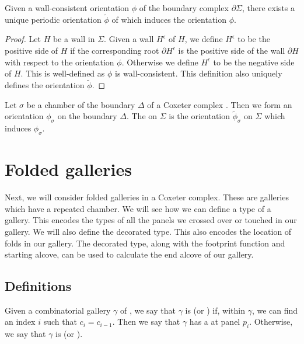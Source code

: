 \documentclass[11pt]{article}
\begin{document}
\begin{lemma}
    Given a wall-consistent orientation $\phi$ of the boundary complex $\partial\Sigma$, there exists a unique periodic orientation $\tilde{\phi}$ of \sg which induces the orientation $\phi$. 
\end{lemma}

\begin{proof}
    Let $H$ be a wall in $\Sigma$. Given a wall $H^\epsilon$ of $H$, we define $H^\epsilon$ to be the positive side of $H$ if the corresponding root $\partial H^\epsilon$ is the positive side of the wall $\partial H$ with respect to the orientation $\phi$. Otherwise we define $H^\epsilon$ to be the negative side of $H$. This is well-defined as $\phi$ is wall-consistent. This definition also uniquely defines the orientation $\tilde{\phi}$. 
\end{proof}

\begin{definition}
    Let $\sigma$ be a chamber of the boundary $\Delta$ of a Coxeter complex \sg. Then we form an orientation $\phi_{\sigma}$ on the boundary $\Delta$. The  on $\Sigma$ is the orientation $\tilde{\phi}_\sigma$ on $\Sigma$ which induces $\phi_{\sigma}$. 
\end{definition}


\section{Folded galleries}\label{7}

Next, we will consider folded galleries in a Coxeter complex. These are galleries which have a repeated chamber. We will see how we can define a type of a gallery. This encodes the types of all the panels we crossed over or touched in our gallery. We will also define the decorated type. This also encodes the location of folds in our gallery. The decorated type, along with the footprint function and starting alcove, can be used to calculate the end alcove of our gallery. 

\subsection{Definitions}


\begin{definition}
    Given a combinatorial gallery $\gamma$ of \sg, we say that $\gamma$ is  (or ) if, within $\gamma$, we can find an index $i$ such that $c_i=c_{i-1}$. Then we say that $\gamma$ has a  at panel $p_i$. Otherwise, we say that $\gamma$ is  (or ).  
\end{definition}
\end{document}
